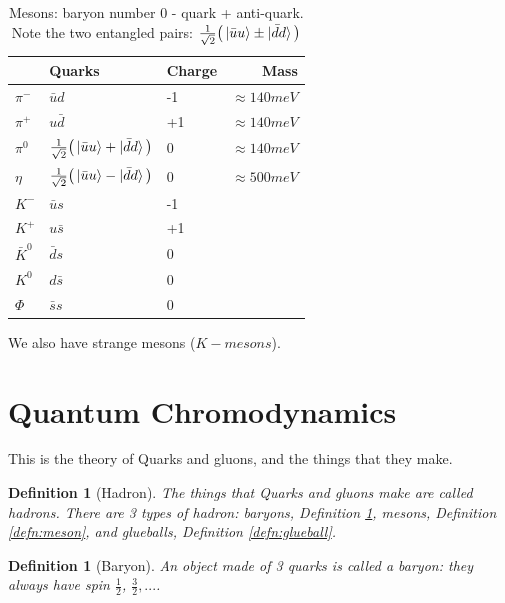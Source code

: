 \documentclass[]{article}
\newtheorem{defn}[thm]{Definition}
\begin{document}
\begin{table}[H]
	\begin{center}
		\caption[Mesons: baryon number 0 - quark + anti-quark]{Mesons: baryon number 0 - quark + anti-quark. Note the two entangled pairs: $\frac{1}{\sqrt{2}}\big(\ket{\bar{u}u}\pm\ket{\bar{d}d}\big)$}\label{table:mesons}
		\begin{tabular}{|l|l|l|r|} \hline
			&Quarks&Charge&Mass\\ \hline
			$\pi^-$&$\bar{u}d$&-1&$\approx140 meV$ \\ \hline
			$\pi^+$&$u\bar{d}$&+1&$\approx140 meV$  \\ \hline
			$\pi^0$&$\frac{1}{\sqrt{2}}\big(\ket{\bar{u}u}+\ket{\bar{d}d}\big)$&0&$\approx140 meV$  \\ \hline
			$\eta$&$\frac{1}{\sqrt{2}}\big(\ket{\bar{u}u}-\ket{\bar{d}d}\big)$& 0&$\approx500 meV$ \\ \hline
			$K^-$&$\bar{u}s$&-1& \\ \hline
			$K^+$&$u\bar{s}$&+1& \\ \hline
			$\bar{K}^0$&$\bar{d}s$&0& \\ \hline
			$K^0$&$d\bar{s}$&0& \\ \hline
			$\Phi$&$\bar{s}s$&0& \\ \hline
		\end{tabular}
	\end{center}
\end{table}

We also have strange mesons ($K-mesons$).


\section{Quantum Chromodynamics}\label{section:qcd}

This is the theory of Quarks and gluons, and the things that they make.

\begin{defn}[Hadron]
	The things that Quarks and gluons make are called hadrons. There are 3 types of hadron: baryons, Definition \ref{defn:baryon}, mesons, Definition \ref{defn:meson}, and glueballs, Definition \ref{defn:glueball}.
\end{defn}

\begin{defn}[Baryon]\label{defn:baryon}
	An object made of 3 quarks is called a baryon: they always have spin $\frac{1}{2}$, $\frac{3}{2},...$.
\end{defn}
\end{document}
